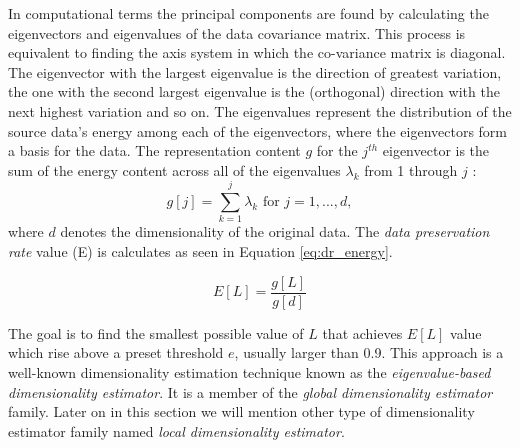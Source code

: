 \iftoggle{edit-mode}{\hspace{0pt}\marginpar{PCA formulation}}{}
In computational terms the principal components are found by calculating the eigenvectors and eigenvalues of the data covariance matrix. This process is equivalent to finding the axis system in which the co-variance matrix is diagonal. The eigenvector with the largest eigenvalue is the direction of greatest variation, the one with the second largest eigenvalue is the (orthogonal) direction with the next highest variation and so on. The eigenvalues represent the distribution of the source data's energy among each of the eigenvectors, where the eigenvectors form a basis for the data. The representation content $g$ for the $j^{th}$ eigenvector is the sum of the energy content across all of the eigenvalues $\lambda_k$ from 1 through $j$ :
\begin{equation}
g[j]=\sum_{k=1}^{j}\lambda_k \text{   for   } j=1,...,d,
\end{equation}
where $d$ denotes the dimensionality of the original data. The \emph{data preservation rate} value (E) is calculates as seen in Equation \ref{eq:dr_energy}. 

\begin{equation}
E[L] = \frac{g[L]}{g[d]}
\label{eq:dr_energy} 
\end{equation} 

The goal is to find the smallest possible value of $L$ that achieves $E[L]$ value which rise above a preset threshold $e$, usually larger than 0.9. This approach is a well-known dimensionality estimation technique known as the \emph{eigenvalue-based dimensionality estimator}. It is a member of the \emph{global dimensionality estimator} family. Later on in this section we will mention other type of dimensionality estimator family named \emph{local dimensionality estimator}.

